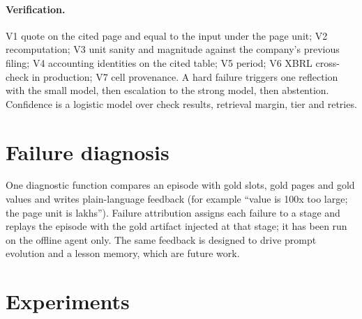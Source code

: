 \documentclass[11pt]{article}
\begin{document}
\paragraph{Verification.} V1 quote on the cited page and equal to the input under the page unit; V2 recomputation; V3 unit sanity and magnitude against the company's previous filing; V4 accounting identities on the cited table; V5 period; V6 XBRL cross-check in production; V7 cell provenance. A hard failure triggers one reflection with the small model, then escalation to the strong model, then abstention. Confidence is a logistic model over check results, retrieval margin, tier and retries.

\section{Failure diagnosis}
One diagnostic function compares an episode with gold slots, gold pages and gold values and writes plain-language feedback (for example ``value is 100x too large; the page unit is lakhs''). Failure attribution assigns each failure to a stage and replays the episode with the gold artifact injected at that stage; it has been run on the offline agent only. The same feedback is designed to drive prompt evolution and a lesson memory, which are future work.

\section{Experiments}

\end{document}
